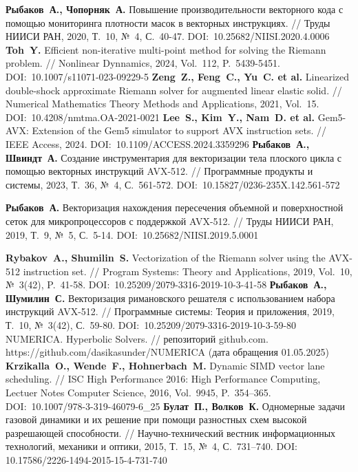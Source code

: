 \begin{thebibliography}{99}
%
\textbf{Рыбаков~А., Чопорняк~А.} Повышение производительности векторного кода с помощью мониторинга плотности масок в векторных инструкциях. // Труды НИИСИ РАН, 2020, Т.~10, №~4, С.~40-47. DOI:~10.25682/NIISI.2020.4.0006
%
\textbf{Toh~Y.} Efficient non-iterative multi-point method for solving the Riemann problem. // Nonlinear Dynnamics, 2024, Vol.~112, P.~5439-5451. DOI:~10.1007/s11071-023-09229-5
%
\textbf{Zeng~Z., Feng~C., Yu~C. et al.} Linearized double-shock approximate Riemann solver for augmented linear elastic solid. // Numerical Mathematics Theory Methods and Applications, 2021, Vol.~15. DOI:~10.4208/nmtma.OA-2021-0021
%
\textbf{Lee~S., Kim~Y., Nam~D. et al.} Gem5-AVX: Extension of the Gem5 simulator to support AVX instruction sets. // IEEE Access, 2024. DOI:~10.1109/ACCESS.2024.3359296
%
\textbf{Рыбаков~А., Швиндт~А.} Создание инструментария для векторизации тела плоского цикла с помощью векторных инструкций AVX-512. // Программные продукты и системы, 2023, Т.~36, №~4, С.~561-572. DOI:~10.15827/0236-235X.142.561-572
%



%
%



%
\textbf{Рыбаков~А.} Векторизация нахождения пересечения объемной и поверхностной сеток для микропроцессоров с поддержкой AVX-512. // Труды НИИСИ РАН, 2019, Т.~9, №~5, С.~5-14. DOI:~10.25682/NIISI.2019.5.0001
%



%
\textbf{Rybakov~A., Shumilin~S.} Vectorization of the Riemann solver using the AVX-512 instruction set. // Program Systems: Theory and Applications, 2019, Vol.~10, №~3(42), P.~41-58. DOI:~10.25209/2079-3316-2019-10-3-41-58
%
\textbf{Рыбаков~А., Шумилин~С.} Векторизация римановского решателя с использованием набора инструкций AVX-512. // Программные системы: Теория и приложения, 2019, Т.~10, №~3(42), С.~59-80. DOI:~10.25209/2079-3316-2019-10-3-59-80
%
NUMERICA. Hyperbolic Solvers. // репозиторий github.com. https://github.com/dasikasunder/NUMERICA (дата обращения 01.05.2025)
%
\textbf{Krzikalla~O., Wende~F., Hohnerbach~M.} Dynamic SIMD vector lane scheduling. // ISC High Performance 2016: High Performance Computing, Lectuer Notes Computer Science, 2016, Vol.~9945, P.~354–365. DOI:~10.1007/978-3-319-46079-6\_25
%
\textbf{Булат~П., Волков~К.} Одномерные задачи газовой динамики и их решение при помощи разностных схем высокой разрешающей способности. // Научно-технический вестник информационных технологий,
механики и оптики, 2015, Т.~15, №~4, С.~731–740. DOI:~ 10.17586/2226-1494-2015-15-4-731-740
%




\end{thebibliography}
